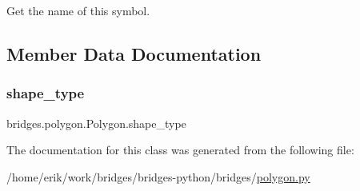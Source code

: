 Get the name of this symbol. 



\subsection{Member Data Documentation}
\mbox{\label{classbridges_1_1polygon_1_1_polygon_ae9c67cb9337ec5deebf1e334e84b3635}} 
\subsubsection{\texorpdfstring{shape\+\_\+type}{shape\_type}}
{\footnotesize\ttfamily bridges.\+polygon.\+Polygon.\+shape\+\_\+type}



The documentation for this class was generated from the following file\+:\begin{DoxyCompactItemize}
\item 
/home/erik/work/bridges/bridges-\/python/bridges/\hyperlink{polygon_8py}{polygon.\+py}\end{DoxyCompactItemize}
